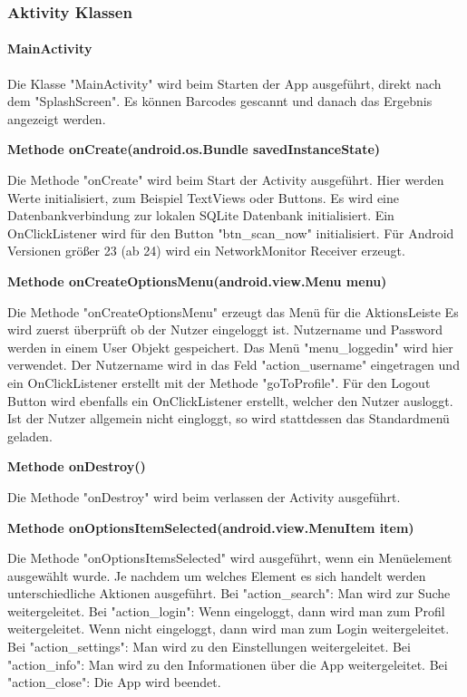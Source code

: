 \documentclass{scrartcl}
\begin{document}
\newpage

\subsubsection{Aktivity Klassen}

\paragraph{MainActivity}

\noindent Die Klasse "MainActivity" wird beim Starten der App ausgeführt, direkt nach dem "SplashScreen". Es können Barcodes gescannt und danach das Ergebnis angezeigt werden.\newline

\noindent\textbf{Methode onCreate(android.os.Bundle savedInstanceState)}

\noindent Die Methode "onCreate" wird beim Start der Activity ausgeführt. Hier werden Werte initialisiert, zum Beispiel TextViews oder Buttons. Es wird eine Datenbankverbindung zur lokalen SQLite Datenbank initialisiert. Ein OnClickListener wird für den Button "btn\_scan\_now" initialisiert. Für Android Versionen größer 23 (ab 24) wird ein NetworkMonitor Receiver erzeugt.\newline

\noindent\textbf{Methode onCreateOptionsMenu(android.view.Menu menu)}

\noindent Die Methode "onCreateOptionsMenu" erzeugt das Menü für die AktionsLeiste Es wird zuerst überprüft ob der Nutzer eingeloggt ist. Nutzername und Password werden in einem User Objekt gespeichert. Das Menü "menu\_loggedin" wird hier verwendet. Der Nutzername wird in das Feld "action\_username" eingetragen und ein OnClickListener erstellt mit der Methode "goToProfile". Für den Logout Button wird ebenfalls ein OnClickListener erstellt, welcher den Nutzer ausloggt. Ist der Nutzer allgemein nicht eingloggt, so wird stattdessen das Standardmenü geladen. \newline

\noindent\textbf{Methode onDestroy()}

\noindent Die Methode "onDestroy" wird beim verlassen der Activity ausgeführt. \newline

\noindent\textbf{Methode onOptionsItemSelected(android.view.MenuItem item)}

\noindent Die Methode "onOptionsItemsSelected" wird ausgeführt, wenn ein Menüelement ausgewählt wurde. Je nachdem um welches Element es sich handelt werden unterschiedliche Aktionen ausgeführt. Bei "action\_search": Man wird zur Suche weitergeleitet. Bei "action\_login": Wenn eingeloggt, dann wird man zum Profil weitergeleitet. Wenn nicht eingeloggt, dann wird man zum Login weitergeleitet. Bei "action\_settings": Man wird zu den Einstellungen weitergeleitet. Bei "action\_info": Man wird zu den Informationen über die App weitergeleitet. Bei "action\_close": Die App wird beendet. \newline
\end{document}
